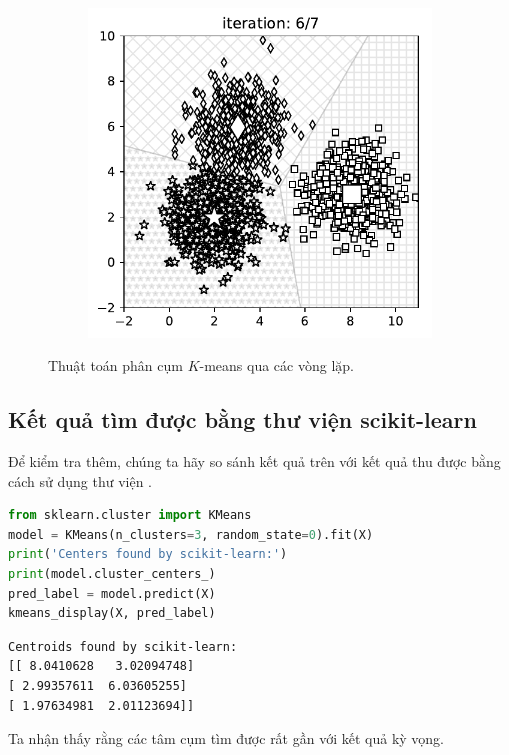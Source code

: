 \begin{figure}[t]
\begin{subfigure}{0.325\textwidth}
\end{subfigure}
\begin{subfigure}{0.325\textwidth}
\includegraphics[width=0.99\linewidth]{ebookML_src/src/kmeans/ex_5.pdf}
\end{subfigure}
\caption{
Thuật toán phân cụm $K$-means qua các vòng lặp.
}
\label{fig:4_example}
\end{figure}




\subsection{Kết quả tìm được bằng thư viện scikit-learn}

Để kiểm tra thêm, chúng ta hãy so sánh kết quả trên với kết quả thu được bằng
cách sử dụng thư viện
\href{http://scikit-learn.org/stable/modules/generated/sklearn.cluster.KMeans.html}{}.

\begin{lstlisting}[language=Python]
from sklearn.cluster import KMeans
model = KMeans(n_clusters=3, random_state=0).fit(X)
print('Centers found by scikit-learn:')
print(model.cluster_centers_)
pred_label = model.predict(X)
kmeans_display(X, pred_label)
\end{lstlisting}
\kq
\begin{lstlisting}
Centroids found by scikit-learn:
[[ 8.0410628   3.02094748]
[ 2.99357611  6.03605255]
[ 1.97634981  2.01123694]]
\end{lstlisting}
Ta nhận thấy rằng các tâm cụm tìm được rất gần với kết quả kỳ vọng.

